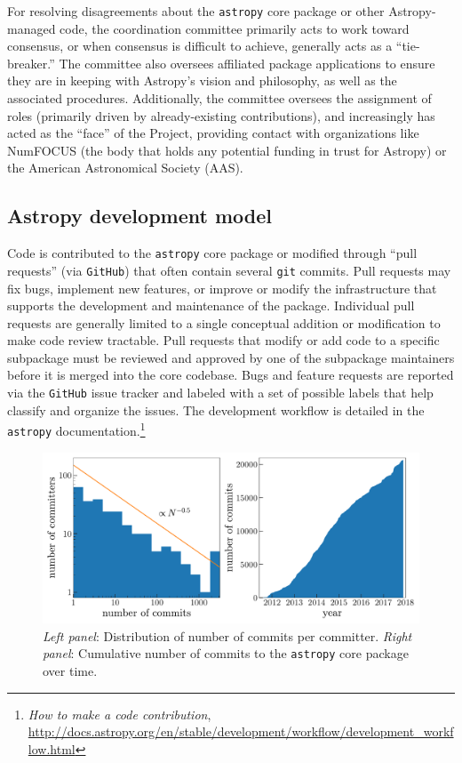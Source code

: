 \documentclass[modern]{aastex61}
\newcommand{\package}[1]{\texttt{#1}\xspace}
\newcommand{\github}{\package{GitHub}}
\newcommand{\astropy}{Astropy\xspace}
\newcommand{\astropypkg}{\package{astropy}}
\begin{document}
For resolving disagreements about the \astropypkg core package or other \astropy-managed code, the coordination committee primarily acts to work toward consensus, or when consensus is difficult to achieve, generally acts as a ``tie-breaker.''
The committee also oversees affiliated package applications to ensure they are in keeping with \astropy's vision and philosophy, as well as the associated procedures.
Additionally, the committee oversees the assignment of roles (primarily driven by already-existing contributions), and increasingly has acted as the ``face'' of the Project, providing contact with organizations like NumFOCUS (the body that holds any potential funding in trust for \astropy) or the American Astronomical Society (AAS).

\subsection{Astropy development model}
Code is contributed to the \astropypkg core package or modified through ``pull
requests'' (via \github) that often contain several \texttt{git} commits.
Pull requests may fix bugs, implement new features, or improve or modify the
infrastructure that supports the development and maintenance of the package.
Individual pull requests are generally limited to a single conceptual addition
or modification to make code review tractable.
Pull requests that modify or add code to a specific subpackage must be reviewed
and approved by one of the subpackage maintainers before it is merged into the
core codebase.
Bugs and feature requests are reported via the \github issue tracker and labeled
with a set of possible labels that help classify and organize the issues.
The development workflow is detailed in the \astropypkg
documentation.\footnote{\emph{How to make a code contribution},
\url{http://docs.astropy.org/en/stable/development/workflow/development_workflow.html}}

\begin{figure}
\includegraphics[width=\textwidth]{ncommits.pdf}
\caption{%
    \emph{Left panel}: Distribution of number of commits per committer.
    \emph{Right panel}: Cumulative number of commits to the \astropypkg core
    package over time.
    \label{fig:ncommits}
}
\end{figure}
\end{document}
